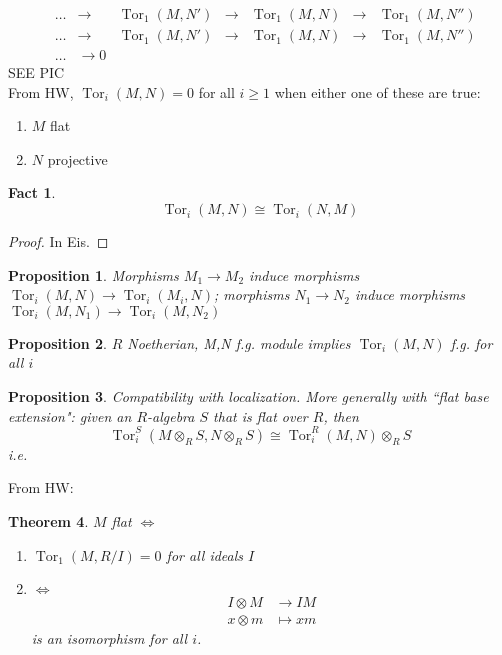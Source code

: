 \documentclass[12pt]{article}
\DeclareMathOperator{\Tor}{Tor}
\newcommand{\mapp}[4]{\begin{align*}
#1 &\to #2\\
#3 & \mapsto #4
\end{align*}}
\newtheorem{theorem}{Theorem}
\newtheorem{prop}[theorem]{Proposition}
\newtheorem*{fact}{Fact}
\theoremstyle{definition}
\begin{document}
\begin{align*}
    &\dots &\rightarrow &\Tor_1(M,N') &\rightarrow &\Tor_1(M,N) &\rightarrow &\Tor_1 (M, N'')\\
    &\dots &\rightarrow &\Tor_1(M,N') &\rightarrow &\Tor_1(M,N) &\rightarrow &\Tor_1 (M, N'')\\
    &\dots &\rightarrow 0
\end{align*}
SEE PIC\\
From HW, $\Tor_i(M,N) = 0$ for all $i\geq 1$ when either one of these are true:
\begin{enumerate}
    \item $M$ flat
    \item $N$ projective
\end{enumerate}
\begin{fact}
\[
\Tor_i(M,N) \cong \Tor_i(N,M)
\]
\end{fact}
\begin{proof}
In Eis.
\end{proof}
\begin{prop}
Morphisms $M_1\rightarrow M_2$ induce morphisms $\Tor_i(M,N) \rightarrow \Tor_i(M_i,N)$; morphisms $N_1\rightarrow N_2$ induce morphisms $\Tor_i(M,N_1)\rightarrow \Tor_i(M,N_2)$
\end{prop}
\begin{prop}
$R$ Noetherian, M,N f.g. module implies $\Tor_i(M,N)$ f.g. for all $i$
\end{prop}
\begin{prop}
Compatibility with localization. More generally with ``flat base extension": given an $R$-algebra $S$ that is flat over $R$, then
\[
\Tor_i^S(M \otimes_R S, N \otimes_R S) \cong \Tor_i^R(M,N) \otimes_R S
\]
i.e. 
\end{prop}
From HW: 

\begin{theorem}
$M$ flat $\iff$
\begin{enumerate}
    \item $\Tor_1(M,R/I) = 0$ for all ideals $I$
    \item $\iff$ 
    \[
    \mapp{I \otimes M}{IM}{x\otimes m}{xm}
    \]
    is an isomorphism for all $i$.
\end{enumerate}
\end{theorem}
\end{document}
